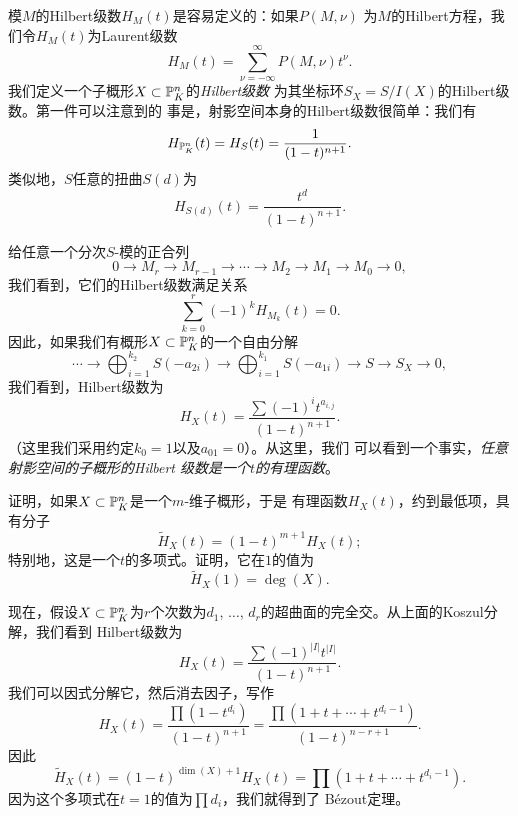 模$M$的Hilbert级数$H_M(t)$是容易定义的：如果$P(M,\nu)$
为$M$的Hilbert方程，我们令$H_M(t)$为Laurent级数
\[
	H_M(t)=\sum_{\nu=-\infty}^\infty P(M,\nu)t^\nu.
\]
我们定义一个子概形$X\subset \P_K^n$的\textit{Hilbert级数}
为其坐标环$S_X=S/I(X)$的Hilbert级数。第一件可以注意到的
事是，射影空间本身的Hilbert级数很简单：我们有
\[
	H_{\P^n_K}(t)=H_S(t)=\frac{1}{(1-t)^{n+1}}.
\]
类似地，$S$任意的扭曲$S(d)$为
\[
	H_{S(d)}(t)=\frac{t^d}{(1-t)^{n+1}}.
\]

给任意一个分次$S$-模的正合列
\[
	0\longrightarrow M_r\longrightarrow M_{r-1}
	\longrightarrow \cdots \longrightarrow M_2
	\longrightarrow M_1 \longrightarrow M_0
	\longrightarrow 0,
\]
我们看到，它们的Hilbert级数满足关系
\[
	\sum_{k=0}^r(-1)^k H_{M_k}(t)=0.
\]
因此，如果我们有概形$X\subset \P_K^n$的一个自由分解
\[
	\cdots \longrightarrow \bigoplus_{i=1}^{k_2}
	S(-a_{2i})\longrightarrow \bigoplus_{i=1}^{k_1}
	S(-a_{1i})\longrightarrow S\longrightarrow S_X
	\longrightarrow 0,
\]
我们看到，Hilbert级数为
\[
	H_X(t)=\frac{\sum (-1)^i t^{a_{i,j}}}{(1-t)^{n+1}}.
\]%
（这里我们采用约定$k_0=1$以及$a_{01}=0$）。从这里，我们
可以看到一个事实，\textit{任意射影空间的子概形的Hilbert
级数是一个$t$的有理函数}。

\begin{exe}\label{exe:3.83}
	证明，如果$X\subset \P_K^n$是一个$m$-维子概形，于是
	有理函数$H_X(t)$，约到最低项，具有分子
	\[
		\tilde{H}_X(t)=(1-t)^{m+1}H_X(t);
	\]
	特别地，这是一个$t$的多项式。证明，它在$1$的值为
	\[
		\tilde{H}_X(1)=\deg(X).
	\]
\end{exe}

现在，假设$X\subset \P_K^n$为$r$个次数为$d_1$, $\dots$, 
$d_r$的超曲面的完全交。从上面的Koszul分解，我们看到
Hilbert级数为
\[
	H_X(t)=\frac{\sum (-1)^{|I|}t^{|I|}}{(1-t)^{n+1}}.
\]
我们可以因式分解它，然后消去因子，写作
\[
	H_X(t)=\frac{\prod (1-t^{d_i})}{(1-t)^{n+1}}
	=\frac{\prod (1+t+\cdots+t^{d_{i}-1})}{(1-t)^{n-r+1}}.
\]
因此
\[
	\tilde{H}_X(t)=(1-t)^{\dim(X)+1}H_X(t)=
	\prod (1+t+\cdots+t^{d_{i}-1}).
\]
因为这个多项式在$t=1$的值为$\prod d_i$，我们就得到了
B\'ezout定理。
